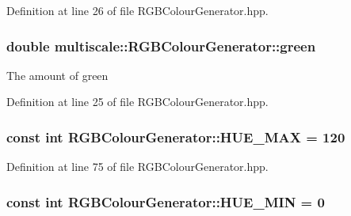 Definition at line 26 of file R\-G\-B\-Colour\-Generator.\-hpp.

\hypertarget{classmultiscale_1_1RGBColourGenerator_ae8d94d24b109954be1da2a04c8ec9af7}{
\subsubsection[{green}]{\setlength{\rightskip}{0pt plus 5cm}double multiscale\-::\-R\-G\-B\-Colour\-Generator\-::green\hspace{0.3cm}{\ttfamily [private]}}}\label{classmultiscale_1_1RGBColourGenerator_ae8d94d24b109954be1da2a04c8ec9af7}
The amount of green 

Definition at line 25 of file R\-G\-B\-Colour\-Generator.\-hpp.

\hypertarget{classmultiscale_1_1RGBColourGenerator_a282d986019f3c02b46c122badf806cd0}{
\subsubsection[{H\-U\-E\-\_\-\-M\-A\-X}]{\setlength{\rightskip}{0pt plus 5cm}const int R\-G\-B\-Colour\-Generator\-::\-H\-U\-E\-\_\-\-M\-A\-X = 120\hspace{0.3cm}{\ttfamily [static]}}}\label{classmultiscale_1_1RGBColourGenerator_a282d986019f3c02b46c122badf806cd0}


Definition at line 75 of file R\-G\-B\-Colour\-Generator.\-hpp.

\hypertarget{classmultiscale_1_1RGBColourGenerator_ae31c47c9fccf50b3688728126040bc23}{
\subsubsection[{H\-U\-E\-\_\-\-M\-I\-N}]{\setlength{\rightskip}{0pt plus 5cm}const int R\-G\-B\-Colour\-Generator\-::\-H\-U\-E\-\_\-\-M\-I\-N = 0\hspace{0.3cm}{\ttfamily [static]}}}\label{classmultiscale_1_1RGBColourGenerator_ae31c47c9fccf50b3688728126040bc23}


